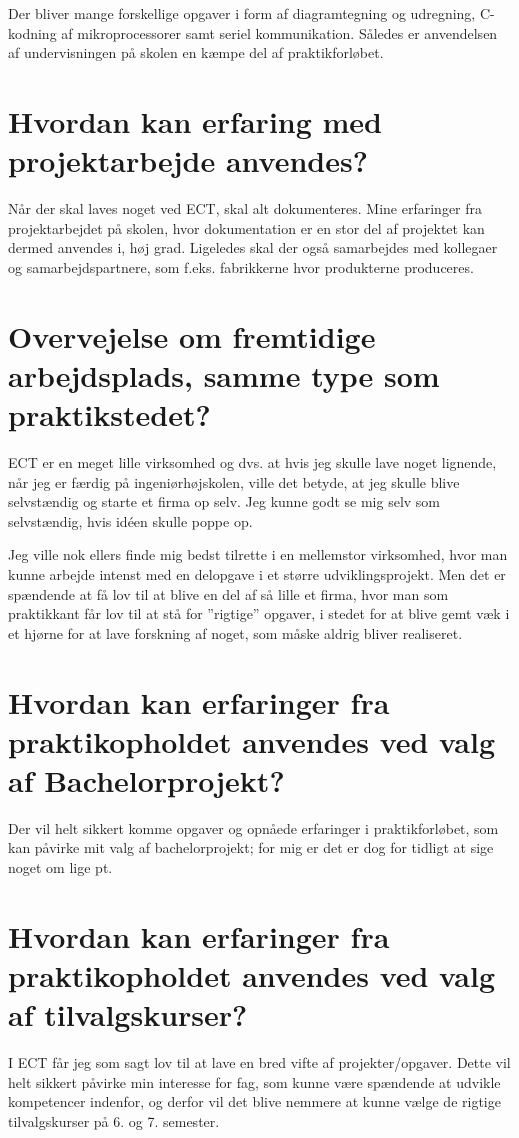 Der bliver mange forskellige opgaver i form af diagramtegning og udregning, C-kodning af mikroprocessorer samt seriel kommunikation. Således er anvendelsen af undervisningen på skolen en kæmpe del af praktikforløbet.

\section*{Hvordan kan erfaring med projektarbejde anvendes?}

Når der skal laves noget ved ECT, skal alt dokumenteres. Mine erfaringer fra projektarbejdet på skolen, hvor dokumentation er en stor del af projektet kan dermed anvendes i, høj grad. Ligeledes skal der også samarbejdes med kollegaer og samarbejdspartnere, som f.eks. fabrikkerne hvor produkterne produceres.

\section*{Overvejelse om fremtidige arbejdsplads, samme type som praktikstedet?}

ECT er en meget lille virksomhed og dvs. at hvis jeg skulle lave noget lignende, når jeg er færdig på ingeniørhøjskolen, ville det betyde, at jeg skulle blive selvstændig og starte et firma op selv. Jeg kunne godt se mig selv som selvstændig, hvis idéen skulle poppe op. 

Jeg ville nok ellers finde mig bedst tilrette i en mellemstor virksomhed, hvor man kunne arbejde intenst med en delopgave i et større udviklingsprojekt. Men det er spændende at få lov til at blive en del af så lille et firma, hvor man som praktikkant får lov til at stå for ''rigtige'' opgaver, i stedet for at blive gemt væk i et hjørne for at lave forskning af noget, som måske aldrig bliver realiseret.

\section*{Hvordan kan erfaringer fra praktikopholdet anvendes ved valg af Bachelorprojekt?}

Der vil helt sikkert komme opgaver og opnåede erfaringer i praktikforløbet, som kan påvirke mit valg af bachelorprojekt; for mig er det er dog for tidligt at sige noget om lige pt.

\section*{Hvordan kan erfaringer fra praktikopholdet anvendes ved valg af tilvalgskurser?}

I ECT får jeg som sagt lov til at lave en bred vifte af projekter/opgaver. Dette vil helt sikkert påvirke min interesse for fag, som kunne være spændende at udvikle kompetencer indenfor, og derfor vil det blive nemmere at kunne vælge de rigtige tilvalgskurser på 6. og 7. semester.


